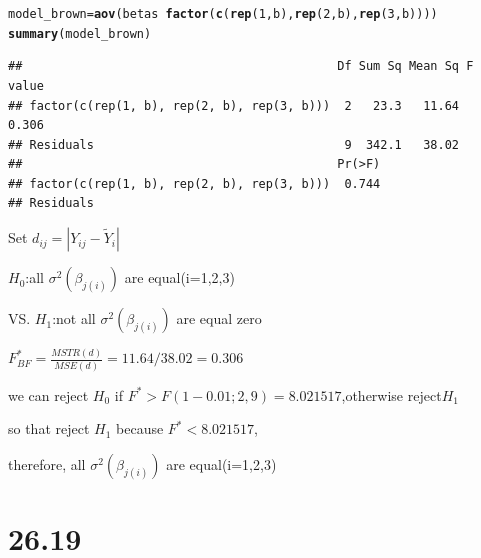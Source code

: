 \documentclass{article}\usepackage[]{graphicx}\usepackage[]{color}
\makeatletter
\newcommand{\hlnum}[1]{\textcolor[rgb]{0.686,0.059,0.569}{#1}}%
\newcommand{\hlopt}[1]{\textcolor[rgb]{0,0,0}{#1}}%
\newcommand{\hlstd}[1]{\textcolor[rgb]{0.345,0.345,0.345}{#1}}%
\newcommand{\hlkwb}[1]{\textcolor[rgb]{0.69,0.353,0.396}{#1}}%
\newcommand{\hlkwd}[1]{\textcolor[rgb]{0.737,0.353,0.396}{\textbf{#1}}}%
\newenvironment{kframe}{%
 \def\at@end@of@kframe{}%
 \ifinner\ifhmode%
  \def\at@end@of@kframe{\end{minipage}}%
  \begin{minipage}{\columnwidth}%
 \fi\fi%
 \def\FrameCommand##1{\hskip\@totalleftmargin \hskip-\fboxsep
 \colorbox{shadecolor}{##1}\hskip-\fboxsep
     \hskip-\linewidth \hskip-\@totalleftmargin \hskip\columnwidth}%
 \MakeFramed {\advance\hsize-\width
   \@totalleftmargin\z@ \linewidth\hsize
   \@setminipage}}%
 {\par\unskip\endMakeFramed%
 \at@end@of@kframe}
\newenvironment{knitrout}{}{} %
\makeatother
\begin{document}
\begin{enumerate}[(a)]
\begin{knitrout}
\begin{kframe}
\begin{alltt}
  \hlstd{model_brown} \hlkwb{=} \hlkwd{aov}\hlstd{(betas} \hlopt{~} \hlkwd{factor}\hlstd{(}\hlkwd{c}\hlstd{(}\hlkwd{rep}\hlstd{(}\hlnum{1}\hlstd{,b),} \hlkwd{rep}\hlstd{(}\hlnum{2}\hlstd{,b),} \hlkwd{rep}\hlstd{(}\hlnum{3}\hlstd{,b))))}
  \hlkwd{summary}\hlstd{(model_brown)}
\end{alltt}
\begin{verbatim}
##                                            Df Sum Sq Mean Sq F value
## factor(c(rep(1, b), rep(2, b), rep(3, b)))  2   23.3   11.64   0.306
## Residuals                                   9  342.1   38.02        
##                                            Pr(>F)
## factor(c(rep(1, b), rep(2, b), rep(3, b)))  0.744
## Residuals
\end{verbatim}
\end{kframe}
\end{knitrout}

Set $d_{ij} = | Y_{ij} - \tilde{Y}_i |$

\begin{center}
$H_0$:all $\sigma^2(\beta_{j(i)})$ are equal(i=1,2,3)

VS. $H_1$:not all $\sigma^2(\beta_{j(i)})$ are equal zero

$F^*_{BF}=\frac{MSTR(d)}{MSE(d)} = 11.64/38.02  = 0.306$

we can reject $H_0$ if $F^* > F(1-0.01;2,9)=8.021517$,otherwise reject$H_1$

so that reject $H_1$ because $F^*<8.021517$,

therefore, all $\sigma^2(\beta_{j(i)})$ are equal(i=1,2,3)
\end{center}

\end{enumerate}

\section{26.19}
\end{document}
